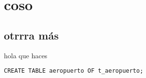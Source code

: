







\clearpage
\tableofcontents
\clearpage 



\section{coso}
\subsection{otrrra más}

hola que haces \autocite{elmasri} \autocite{pattern}



\clearpage
\printbibliography




\vspace*{5mm}
\lstset{style=sql}
\begin{lstlisting}
CREATE TABLE aeropuerto OF t_aeropuerto;
\end{lstlisting}
